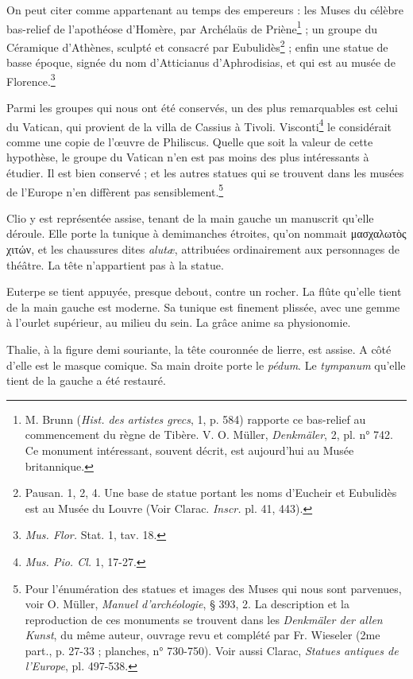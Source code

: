 \documentclass[landscape, a4paper, 11pt, oneside, polutonikogreek, french]{article}
\begin{document}
On peut citer comme appartenant au temps des empereurs : les Muses du célèbre bas-relief de l'apothéose d'Homère, par Archélaüs de Priène\footnote{M. Brunn (\emph{Hist. des artistes grecs}, 1, p. 584) rapporte ce bas-relief au commencement du règne de Tibère. V. O. Müller, \emph{Denkmäler}, 2, pl. n° 742. Ce monument intéressant, souvent décrit, est aujourd'hui au Musée britannique.} ; un groupe du Céramique d'Athènes, sculpté et consacré par Eubulidès\footnote{Pausan. 1, 2, 4. Une base de statue portant les noms d'Eucheir et Eubulidès est au Musée du Louvre (Voir Clarac. \emph{Inscr.} pl. 41, 443).} ; enfin une statue de basse époque, signée du nom d'Atticianus d'Aphrodisias, et qui est au musée de Florence.\footnote{\emph{Mus. Flor.} Stat. 1, tav. 18.}

Parmi les groupes qui nous ont été conservés, un des plus remarquables est celui du Vatican, qui provient de la villa de Cassius à Tivoli. Visconti\footnote{\emph{Mus. Pio. Cl.} 1, 17-27.} le considérait comme une copie de l'œuvre de Philiscus. Quelle que soit la valeur de cette hypothèse, le groupe du Vatican n'en est pas moins des plus intéressants à étudier. Il est bien conservé ; et les autres statues qui se trouvent dans les musées de l'Europe n'en diffèrent pas sensiblement.\footnote{Pour l'énumération des statues et images des Muses qui nous sont parvenues, voir O. Müller, \emph{Manuel d'archéologie}, § 393, 2. La description et la reproduction de ces monuments se trouvent dans les \emph{Denkmäler der allen Kunst}, du même auteur, ouvrage revu et complété par Fr. Wieseler (2me part., p. 27-33 ; planches, n° 730-750). Voir aussi Clarac, \emph{Statues antiques de l'Europe}, pl. 497-538.}

Clio y est représentée assise, tenant de la main gauche un manuscrit qu'elle déroule. Elle porte la tunique à demimanches étroites, qu'on nommait μασχαλωτὸς χιτών, et les chaussures dites \emph{alutæ}, attribuées ordinairement aux personnages de théâtre. La tête n'appartient pas à la statue.

Euterpe se tient appuyée, presque debout, contre un rocher. La flûte qu'elle tient de la main gauche est moderne. Sa tunique est finement plissée, avec une gemme à l'ourlet supérieur, au milieu du sein. La grâce anime sa physionomie.

Thalie, à la figure demi souriante, la tête couronnée de lierre, est assise. A côté d'elle est le masque comique. Sa main droite porte le \emph{pédum}. Le \emph{tympanum} qu'elle tient de la gauche a été restauré.
\end{document}

